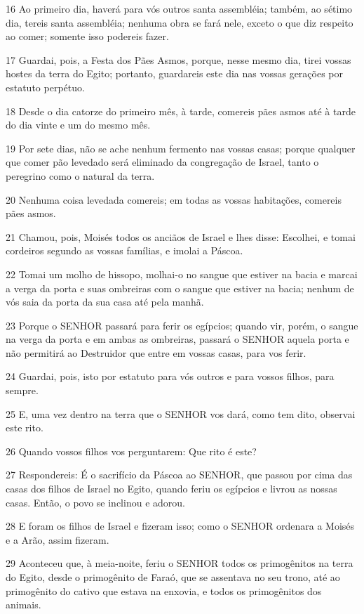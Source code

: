 \par 16 Ao primeiro dia, haverá para vós outros santa assembléia; também, ao sétimo dia, tereis santa assembléia; nenhuma obra se fará nele, exceto o que diz respeito ao comer; somente isso podereis fazer.
\par 17 Guardai, pois, a Festa dos Pães Asmos, porque, nesse mesmo dia, tirei vossas hostes da terra do Egito; portanto, guardareis este dia nas vossas gerações por estatuto perpétuo.
\par 18 Desde o dia catorze do primeiro mês, à tarde, comereis pães asmos até à tarde do dia vinte e um do mesmo mês.
\par 19 Por sete dias, não se ache nenhum fermento nas vossas casas; porque qualquer que comer pão levedado será eliminado da congregação de Israel, tanto o peregrino como o natural da terra.
\par 20 Nenhuma coisa levedada comereis; em todas as vossas habitações, comereis pães asmos.
\par 21 Chamou, pois, Moisés todos os anciãos de Israel e lhes disse: Escolhei, e tomai cordeiros segundo as vossas famílias, e imolai a Páscoa.
\par 22 Tomai um molho de hissopo, molhai-o no sangue que estiver na bacia e marcai a verga da porta e suas ombreiras com o sangue que estiver na bacia; nenhum de vós saia da porta da sua casa até pela manhã.
\par 23 Porque o SENHOR passará para ferir os egípcios; quando vir, porém, o sangue na verga da porta e em ambas as ombreiras, passará o SENHOR aquela porta e não permitirá ao Destruidor que entre em vossas casas, para vos ferir.
\par 24 Guardai, pois, isto por estatuto para vós outros e para vossos filhos, para sempre.
\par 25 E, uma vez dentro na terra que o SENHOR vos dará, como tem dito, observai este rito.
\par 26 Quando vossos filhos vos perguntarem: Que rito é este?
\par 27 Respondereis: É o sacrifício da Páscoa ao SENHOR, que passou por cima das casas dos filhos de Israel no Egito, quando feriu os egípcios e livrou as nossas casas. Então, o povo se inclinou e adorou.
\par 28 E foram os filhos de Israel e fizeram isso; como o SENHOR ordenara a Moisés e a Arão, assim fizeram.
\par 29 Aconteceu que, à meia-noite, feriu o SENHOR todos os primogênitos na terra do Egito, desde o primogênito de Faraó, que se assentava no seu trono, até ao primogênito do cativo que estava na enxovia, e todos os primogênitos dos animais.
